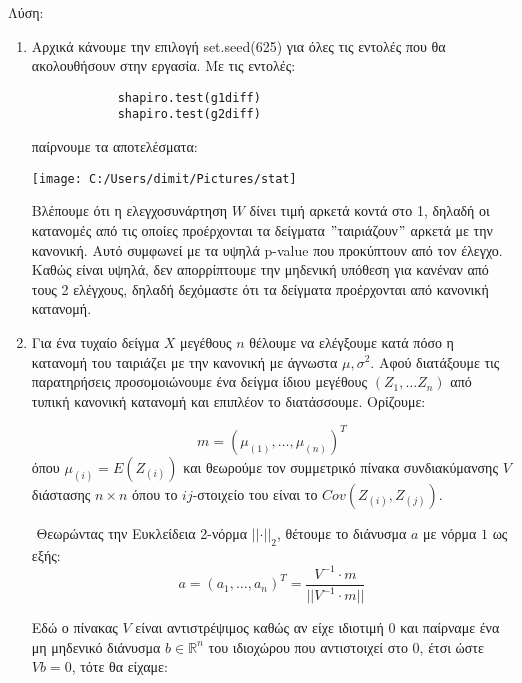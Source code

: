 \documentclass[oneside,a4paper]{article}
\newcommand {\tl}{\textlatin}
\begin{document}
\pagebreak
{\huge Λύση:}
\vspace{1cm}
\begin{enumerate}
    \item Αρχικά κάνουμε την επιλογή \tl{set.seed(625)} για όλες τις εντολές που θα ακολουθήσουν στην εργασία. Με τις εντολές:
        \begin{center}
            {
            \begin{lstlisting}
            shapiro.test(g1diff)
            shapiro.test(g2diff)
        \end{lstlisting} }
        \end{center}
        παίρνουμε τα αποτελέσματα:
        \begin{center}
        \texttt{[image: C:/Users/dimit/Pictures/stat]}
        \end{center}

        Βλέπουμε ότι η ελεγχοσυνάρτηση $W$ δίνει τιμή αρκετά κοντά στο 1, δηλαδή οι κατανομές από τις οποίες προέρχονται τα δείγματα $"$ταιριάζουν$"$ αρκετά με την κανονική. Αυτό συμφωνεί με τα υψηλά \tl{p-value} που προκύπτουν από τον έλεγχο. Καθώς είναι υψηλά, δεν απορρίπτουμε την μηδενική υπόθεση για κανέναν από τους 2 ελέγχους, δηλαδή δεχόμαστε ότι τα δείγματα προέρχονται από κανονική κατανομή.
       
    \vspace{1cm}    
    \item Για ένα τυχαίο δείγμα $X$ μεγέθους $n$ θέλουμε να ελέγξουμε κατά πόσο η κατανομή του ταιριάζει με την κανονική με άγνωστα $\mu , \sigma^2$. Αφού διατάξουμε τις παρατηρήσεις προσομοιώνουμε ένα δείγμα ίδιου μεγέθους $(Z_1 , \ldots Z_n )$ από τυπική κανονική κατανομή και επιπλέον το διατάσσουμε. Ορίζουμε:

    $$m = (\mu_{(1)} , \ldots, \mu_{(n)})^T$$ 
    όπου $\mu_{(i)} = E(Z_{(i)})$ και θεωρούμε τον συμμετρικό πίνακα συνδιακύμανσης $V$ διάστασης $n\times n$ όπου το $ij$-στοιχείο του είναι το $Cov(Z_{(i)}, Z_{(j)})$.
    
    $ $\newline
    Θεωρώντας την Ευκλείδεια 2-νόρμα $\vert\vert \cdot \vert\vert_2$, θέτουμε το διάνυσμα $a$ με νόρμα $1$ ως εξής:
    $$a = ( a_1 ,\ldots, a_n )^T = \frac{V^{-1} \cdot m}{\vert\vert V^{-1} \cdot m \vert\vert}$$
     
    
    Εδώ ο πίνακας $V$ είναι αντιστρέψιμος καθώς αν είχε ιδιοτιμή $0$ και παίρναμε ένα μη μηδενικό διάνυσμα $b \in \mathbb{R}^n$ του ιδιοχώρου που αντιστοιχεί στο 0, έτσι ώστε $Vb = 0$, τότε θα είχαμε:
    

\end{enumerate}
\end{document}
